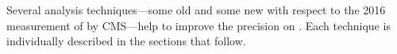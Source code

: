 Several analysis techniques---some old and some new with respect to the 2016 measurement of \mH by CMS---help to improve the precision on \mH. %
Each technique is individually described in the sections that follow.





% 
